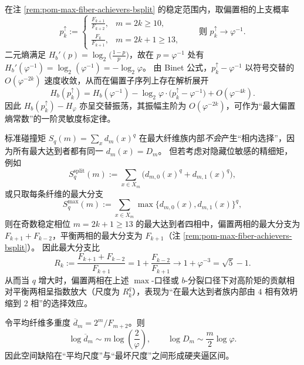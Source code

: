 

\begin{remark}[最大偏置熵常数的线性响应与交替振荡：\texorpdfstring{$H_b'(\varphi^{-1})=-\log_2\varphi$}{Hb'(phi^{-1})=-log2 phi}（227）]\label{rem:pom-max-fiber-hidden-bit-entropy-linear-response}
在注 \ref{rem:pom-max-fiber-achievers-bsplit} 的稳定范围内，取偏置相的上支概率
\[
p_k^{\uparrow}:=
\begin{cases}
\frac{F_{k+1}}{F_{k+2}},& m=2k\ge 10,\\
\frac{F_{k}}{F_{k+1}},& m=2k+1\ge 13,
\end{cases}
\qquad\text{则 }p_k^{\uparrow}\to\varphi^{-1}.
\]
二元熵满足 \(H_b'(p)=\log_2\!\bigl(\frac{1-p}{p}\bigr)\)，故在 \(p=\varphi^{-1}\) 处有 \(H_b'(\varphi^{-1})=\log_2(\varphi^{-1})=-\log_2\varphi\)。
由 Binet 公式，\(p_k^{\uparrow}-\varphi^{-1}\) 以符号交替的 \(O(\varphi^{-2k})\) 速度收敛，从而在偏置子序列上存在解析展开
\[
H_b(p_k^{\uparrow})
=H_b(\varphi^{-1})-\log_2\varphi\cdot\bigl(p_k^{\uparrow}-\varphi^{-1}\bigr)+O(\varphi^{-4k}).
\]
因此 \(H_b(p_k^{\uparrow})-H_\varphi\) 亦呈交替振荡，其振幅主阶为 \(O(\varphi^{-2k})\)，可作为“最大偏置熵常数”的一阶灵敏度标定律。
\end{remark}

\begin{remark}\label{rem:pom-max-fiber-bsplit-phase-selection}
标准碰撞矩 \(S_q(m)=\sum_x d_m(x)^q\) 在最大纤维族内部\emph{不会}产生“相内选择”，因为所有最大达到者都有同一 \(d_m(x)=D_m\)。
但若考虑对隐藏位敏感的精细矩，例如
\[
S_q^{\mathrm{split}}(m):=\sum_{x\in X_m}\bigl(d_{m,0}(x)^q+d_{m,1}(x)^q\bigr),
\]
或只取每条纤维的最大分支
\[
S_q^{\max}(m):=\sum_{x\in X_m}\max\{d_{m,0}(x),d_{m,1}(x)\}^q,
\]
则在奇数稳定相位 \(m=2k+1\ge 13\) 的最大达到者四相中，偏置两相的最大分支为 \(F_{k+1}+F_{k-2}\)，平衡两相的最大分支为 \(F_{k+1}\)（注 \ref{rem:pom-max-fiber-achievers-bsplit}）。
因此最大分支比
\[
R_k:=\frac{F_{k+1}+F_{k-2}}{F_{k+1}}=1+\frac{F_{k-2}}{F_{k+1}}\longrightarrow 1+\varphi^{-3}=\sqrt5-1.
\]
从而当 \(q\) 增大时，偏置两相在上述 \(\max\)-口径或 \(b\)-分裂口径下对高阶矩的贡献相对平衡两相呈指数放大（尺度为 \(R_k^q\)），表现为“在最大达到者族内部由 \(4\) 相有效坍缩到 \(2\) 相”的选择效应。
\end{remark}

\begin{corollary}[空间缺陷的夹逼区间]\label{cor:pom-defect-band}
令平均纤维多重度 $\overline d_m=2^m/F_{m+2}$。则
\[
\log \overline d_m\sim m\log\!\left(\frac{2}{\varphi}\right),
\qquad
\log D_m\sim \frac{m}{2}\log\varphi.
\]
因此空间缺陷在“平均尺度”与“最坏尺度”之间形成硬夹逼区间。
\end{corollary}

